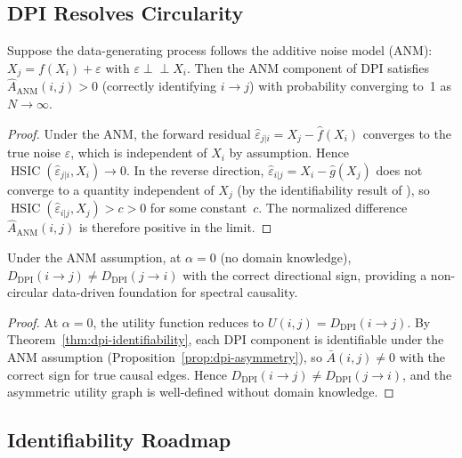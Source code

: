 \documentclass[twoside,11pt]{article}
\DeclareMathOperator{\HSIC}{HSIC}
\newcommand{\DPI}{\mathrm{DPI}}
\begin{document}
\subsection{DPI Resolves Circularity}

\begin{theorem}
\label{thm:dpi-identifiability}
Suppose the data-generating process follows the additive noise model
(ANM): $X_j=f(X_i)+\varepsilon$ with $\varepsilon\perp\!\!\!\perp X_i$.
Then the ANM component of DPI satisfies
$\hat{A}_{\mathrm{ANM}}(i,j)>0$ (correctly identifying $i\to j$) with
probability converging to~1 as $N\to\infty$.
\end{theorem}

\begin{proof}
Under the ANM, the forward residual
$\hat\varepsilon_{j|i}=X_j-\hat{f}(X_i)$ converges to the true noise
$\varepsilon$, which is independent of $X_i$ by assumption.  Hence
$\HSIC(\hat\varepsilon_{j|i},X_i)\to 0$.  In the reverse direction,
$\hat\varepsilon_{i|j}=X_i-\hat{g}(X_j)$ does not converge to a
quantity independent of $X_j$ (by the identifiability result of
\citealp{Hoyer2009}), so $\HSIC(\hat\varepsilon_{i|j},X_j)>c>0$ for
some constant~$c$.  The normalized difference
$\hat{A}_{\mathrm{ANM}}(i,j)$ is therefore positive in the limit.
\end{proof}

\begin{corollary}
\label{cor:alpha-zero}
Under the ANM assumption, at $\alpha=0$ (no domain knowledge),
$D_{\DPI}(i\to j)\ne D_{\DPI}(j\to i)$ with the correct directional
sign, providing a non-circular data-driven foundation for spectral
causality.
\end{corollary}

\begin{proof}
At $\alpha=0$, the utility function reduces to
$U(i,j)=D_{\DPI}(i\to j)$.  By Theorem~\ref{thm:dpi-identifiability},
each DPI component is identifiable under the ANM assumption
(Proposition~\ref{prop:dpi-asymmetry}), so
$\bar{A}(i,j)\ne 0$ with the correct sign for true causal edges.
Hence $D_{\DPI}(i\to j)\ne D_{\DPI}(j\to i)$, and the asymmetric
utility graph is well-defined without domain knowledge.
\end{proof}

\subsection{Identifiability Roadmap}
\end{document}
